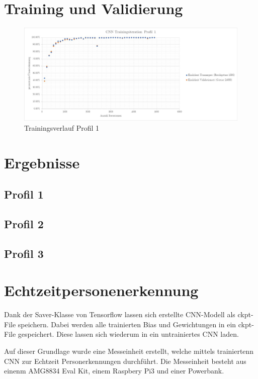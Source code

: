 \section{Training und Validierung}




\begin{figure}[H]
	\centering
	\caption{Trainingsverlauf Profil 1}
	\label{fig:traininsverlauf}
	\includegraphics[width=1.0\linewidth]{fig/Traininsverlauf}
\end{figure}


\section{Ergebnisse}


\subsection{Profil 1}


\subsection{Profil 2}


\subsection{Profil 3}


\section{Echtzeitpersonenerkennung}

Dank der Saver-Klasse von Tensorflow lassen sich erstellte CNN-Modell als ckpt-File speichern. Dabei werden alle trainierten Bias und Gewichtungen in ein ckpt-File gespeichert. Diese lassen sich wiederum in ein untrainiertes CNN laden.

Auf dieser Grundlage wurde eine Messeinheit erstellt, welche mittels trainiertenn CNN zur Echtzeit Personerkennungen durchführt. Die Messeinheit besteht aus einenm AMG8834 Eval Kit, einem Raspbery Pi3 und einer Powerbank.

